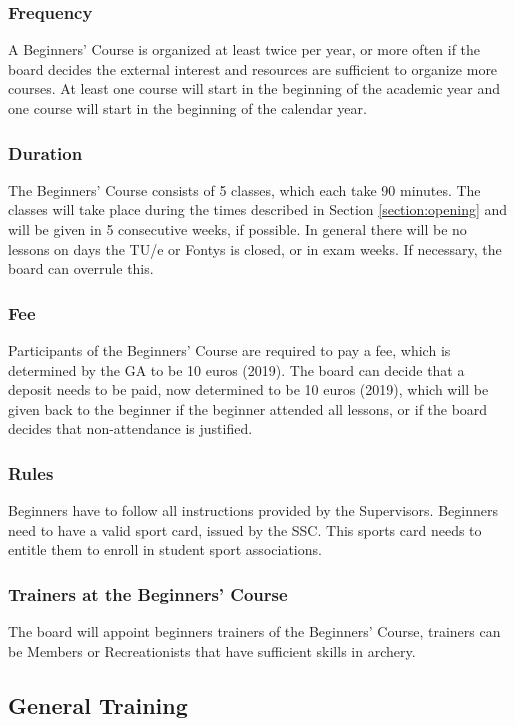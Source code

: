 \documentclass[a4paper]{article}
\begin{document}
\subsubsection{Frequency}
A Beginners' Course is organized at least twice per year, or more often if the board decides the external interest and resources are sufficient to organize more courses. At least one course will start in the beginning of the academic year and one course will start in the beginning of the calendar year.

\subsubsection{Duration}
The Beginners' Course consists of 5 classes, which each take 90 minutes. The classes will take place during the times described in Section \ref{section:opening} and will be given in 5 consecutive weeks, if possible. In general there will be no lessons on days the TU/e or Fontys is closed, or in exam weeks. If necessary, the board can overrule this.

\subsubsection{Fee}
Participants of the Beginners' Course are required to pay a fee, which is determined by the GA to be 10 euros {\g (2019)}. The board can decide that a deposit needs to be paid, now determined to be 10 euros {\g (2019)}, which will be given back to the beginner if the beginner attended all lessons, or if the board decides that non-attendance is justified.

\subsubsection{Rules}
Beginners have to follow all instructions provided by the Supervisors. Beginners need to have a valid sport card, issued by the SSC. This sports card needs to entitle them to enroll in student sport associations.

\subsubsection{Trainers at the Beginners' Course}
The board will appoint beginners trainers of the Beginners' Course, trainers can be Members or Recreationists that have sufficient skills in archery.

\subsection{General Training}
\end{document}
